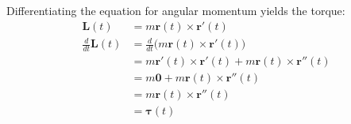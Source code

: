 %
%
%
%
%
\item
\BEN
\item Differentiating the equation for angular momentum yields the torque:
\begin{align*}
\mathbf{L}(t) &= m\mathbf{r}(t)\times \mathbf{r}'(t) \\
\frac{d}{dt}\mathbf{L}(t) &= \frac{d}{dt} \Big(m\mathbf{r}(t)\times \mathbf{r}'(t) \Big)\\
&=m\mathbf{r}'(t)\times \mathbf{r}'(t) + m\mathbf{r}(t)\times \mathbf{r}''(t) \\
&=m\mathbf{0}  + m\mathbf{r}(t)\times \mathbf{r}''(t) \\
&=m\mathbf{r}(t)\times \mathbf{r}''(t) \\
&= \boldsymbol\tau(t)
\end{align*}
